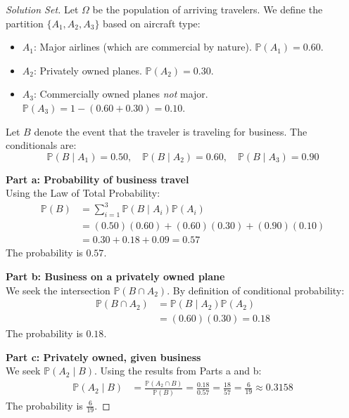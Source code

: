 \documentclass[11pt, letterpaper]{article}
\theoremstyle{definition}
\renewcommand{\P}{\mathbb{P}}
\begin{document}
\begin{proof}[Solution Set]
Let $\Omega$ be the population of arriving travelers. We define the partition $\{A_1, A_2, A_3\}$ based on aircraft type:
\begin{itemize}
    \item $A_1$: Major airlines (which are commercial by nature). $\P(A_1) = 0.60$.
    \item $A_2$: Privately owned planes. $\P(A_2) = 0.30$.
    \item $A_3$: Commercially owned planes \textit{not} major. $\P(A_3) = 1 - (0.60 + 0.30) = 0.10$.
\end{itemize}
Let $B$ denote the event that the traveler is traveling for business. The conditionals are:
\[ \P(B \mid A_1) = 0.50, \quad \P(B \mid A_2) = 0.60, \quad \P(B \mid A_3) = 0.90 \]

\textbf{Part a: Probability of business travel} \\
Using the Law of Total Probability:
\begin{align*}
    \P(B) &= \sum_{i=1}^{3} \P(B \mid A_i)\P(A_i) \\
    &= (0.50)(0.60) + (0.60)(0.30) + (0.90)(0.10) \\
    &= 0.30 + 0.18 + 0.09 = 0.57
\end{align*}
The probability is $0.57$.

\textbf{Part b: Business on a privately owned plane} \\
We seek the intersection $\P(B \cap A_2)$. By definition of conditional probability:
\begin{align*}
    \P(B \cap A_2) &= \P(B \mid A_2)\P(A_2) \\
    &= (0.60)(0.30) = 0.18
\end{align*}
The probability is $0.18$.

\textbf{Part c: Privately owned, given business} \\
We seek $\P(A_2 \mid B)$. Using the results from Parts a and b:
\begin{align*}
    \P(A_2 \mid B) &= \frac{\P(A_2 \cap B)}{\P(B)} = \frac{0.18}{0.57} = \frac{18}{57} = \frac{6}{19} \approx 0.3158
\end{align*}
The probability is $\frac{6}{19}$.


\end{proof}
\end{document}
